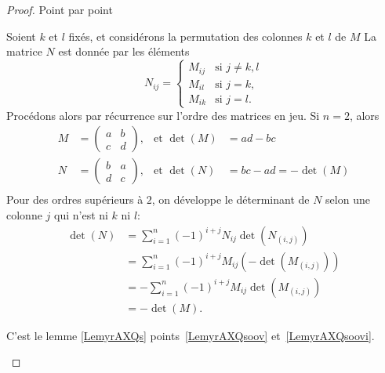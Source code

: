 \begin{proof}
    Point par point
    \begin{subproof}
    \item[\ref{ITEMooAIHWooHXzeys}]
    Soient \( k\) et \( l\) fixés, et considérons la permutation des colonnes \( k\) et \( l\) de \(M \) La matrice \( N\) est donnée par les éléments
            \begin{equation}
                N_{ij}=\begin{cases}
                    M_{ij}    &   \text{si } j\neq k, l\\
                    M_{il}    &    \text{si } j=k,\\
                    M_{ik}    &    \text{si } j=l.
                \end{cases}
            \end{equation}
   Procédons alors par récurrence sur l'ordre des matrices en jeu. Si \( n = 2\), alors
   \begin{subequations}
    \begin{align}
      M &= \begin{pmatrix} a&b\\c&d\end{pmatrix}, &\text{et }\det(M) & = ad - bc\\
      N &= \begin{pmatrix} b&a\\d&c\end{pmatrix}, &\text{et }\det(N) & = bc - ad = - \det(M)\\
    \end{align}
   \end{subequations}
   Pour des ordres supérieurs à \( 2 \), on développe le déterminant de \( N \) selon une colonne \( j \) qui n'est ni \( k \) ni \( l \):
             \begin{subequations}
                  \begin{align}
                \det(N) &= \sum_{i = 1}^n (-1)^{i+j} N_{ij} \det(N_{(i,j)})\\
                &= \sum_{i = 1}^n (-1)^{i+j} M_{ij} (- \det(M_{(i,j)}))\\
                &= - \sum_{i = 1}^n (-1)^{i+j} M_{ij}  \det(M_{(i,j)})\\
                &= - \det(M).
            \end{align}
   \end{subequations}
        
            
\item[\ref{ITEMooDNHWooOMgmxa}]
     C'est le lemme \ref{LemyrAXQs} points~\ref{LemyrAXQsoov} et~\ref{LemyrAXQsoovi}.



\end{subproof}
\end{proof}
